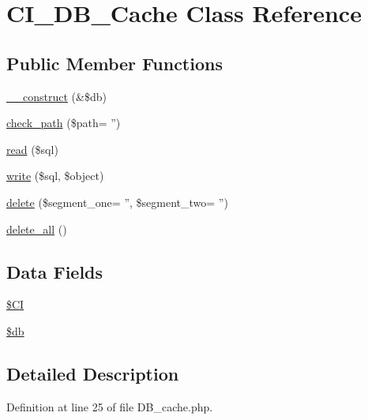 \hypertarget{class_c_i___d_b___cache}{\section{C\-I\-\_\-\-D\-B\-\_\-\-Cache Class Reference}
\label{class_c_i___d_b___cache}
}
\subsection*{Public Member Functions}
\begin{DoxyCompactItemize}
\item 
\hyperlink{class_c_i___d_b___cache_aaf2ef772755ec6f361d44e16cc9ffd69}{\-\_\-\-\_\-construct} (\&\$db)
\item 
\hyperlink{class_c_i___d_b___cache_abfc83fa929a7465bb8cf3d6945b4c6a1}{check\-\_\-path} (\$path= '')
\item 
\hyperlink{class_c_i___d_b___cache_a6e421e93555105d187d7e6ba4c84521b}{read} (\$sql)
\item 
\hyperlink{class_c_i___d_b___cache_a483ea50183465928c931aa17b4f4b5b8}{write} (\$sql, \$object)
\item 
\hyperlink{class_c_i___d_b___cache_a309c0e75720989c8d45fa47bbf05b5a9}{delete} (\$segment\-\_\-one= '', \$segment\-\_\-two= '')
\item 
\hyperlink{class_c_i___d_b___cache_ac83c8ea1573fe325dfd87a282627fe6d}{delete\-\_\-all} ()
\end{DoxyCompactItemize}
\subsection*{Data Fields}
\begin{DoxyCompactItemize}
\item 
\hyperlink{class_c_i___d_b___cache_ae0314d046ddf7fcfaec03222977427d3}{\$\-C\-I}
\item 
\hyperlink{class_c_i___d_b___cache_a1fa3127fc82f96b1436d871ef02be319}{\$db}
\end{DoxyCompactItemize}


\subsection{Detailed Description}


Definition at line 25 of file D\-B\-\_\-cache.\-php.



